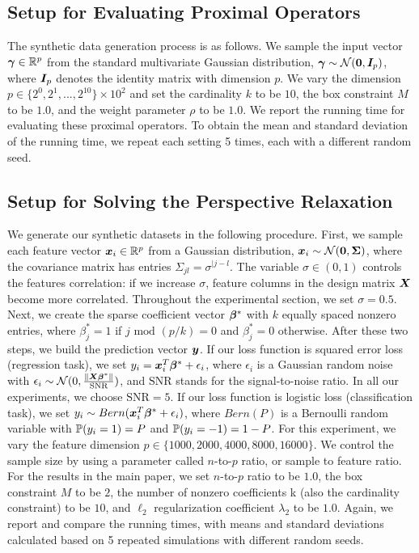\subsection{Setup for Evaluating Proximal Operators}
\label{appendix:setup_for_evaluating_proximal_operators}
The synthetic data generation process is as follows.
We sample the input vector $\bm{\gamma} \in \mathbb{R}^p$ from the standard multivariate Gaussian distribution, $\bm{\gamma} \sim \mathcal{N}(\mathbf{0}, \bm{I}_p)$, where $\bm{I}_p$ denotes the identity matrix with dimension $p$.
We vary the dimension $p \in \{2^0, 2^1, ..., 2^{10}\} \times 10^2$ and set the cardinality $k$ to be $10$, the box constraint $M$ to be $1.0$, and the weight parameter $\rho$  to be $1.0$.
We report the running time for evaluating these proximal operators.
To obtain the mean and standard deviation of the running time, we repeat each setting 5 times, each with a different random seed.

\subsection{Setup for Solving the Perspective Relaxation}
\label{appendix:setup_for_solving_the_perspective_relaxation}

We generate our synthetic datasets in the following procedure.
First, we sample each feature vector $\bm{x}_i \in \mathbb{R}^p $ from a Gaussian distribution, $\bm{x}_i \sim \mathcal{N}(\mathbf{0}, \bm{\Sigma})$, where the covariance matrix has entries $\Sigma_{jl} = \sigma^{\vert{j-l}}$.
The variable $\sigma \in (0, 1)$ controls the features correlation: if we increase $\sigma$, feature columns in the design matrix $\bm{X}$ become more correlated.
Throughout the experimental section, we set $\sigma=0.5$.
Next, we create the sparse coefficient vector $\bm{\beta}^*$ with $k$ equally spaced nonzero entries, where $\beta^*_j = 1$ if $j \text{ mod } (p/k) = 0$ and $\beta^*_j = 0$ otherwise.
After these two steps, we build the prediction vector $\bm{y}$.
If our loss function is squared error loss (regression task), we set $y_i = \bm{x}_i^T \bm{\beta}^* + \epsilon_i$, where $\epsilon_i$ is a Gaussian random noise with $\epsilon_i \sim \mathcal{N}(0, \frac{\lVert \bm{X} \bm{\beta}^* \rVert}{\text{SNR}})$, and $\text{SNR}$ stands for the signal-to-noise ratio.
In all our experiments, we choose $\text{SNR}=5$.
If our loss function is logistic loss (classification task), we set $y_i \sim Bern(\bm{x}_i^T \bm{\beta}^* + \epsilon_i)$, where $Bern(P)$ is a Bernoulli random variable with $\mathbb{P}(y_i = 1) = P$ and $\mathbb{P}(y_i = -1) = 1 - P$.
For this experiment, we vary the feature dimension $p \in \{1000, 2000, 4000, 8000, 16000\}$.
We control the sample size by using a parameter called $n$-to-$p$ ratio, or sample to feature ratio.
For the results in the main paper, we set $n$-to-$p$ ratio to be $1.0$, the box constraint $M$ to be $2$, the number of nonzero coefficients k (also the cardinality constraint) to be $10$, and $\ell_2$ regularization coefficient $\lambda_2$ to be $1.0$.
Again, we report and compare the running times, with means and standard deviations calculated based on 5 repeated simulations with different random seeds.

